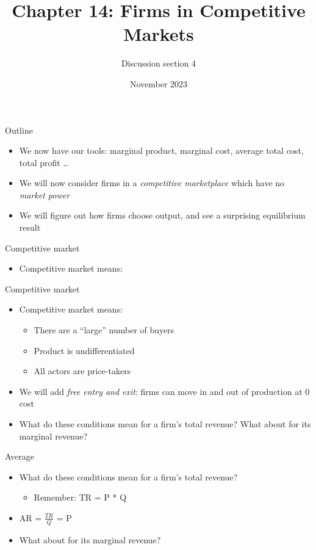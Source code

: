 \documentclass[aspectratio=169]{beamer}
\title{Chapter 14: Firms in Competitive Markets}
\author{Discussion section 4}
\date{November 2023}
\begin{document}
\begin{frame}
    \titlepage 
\end{frame}

\begin{frame}{Outline}
    \begin{itemize}
        \item We now have our tools: marginal product, marginal cost, average total cost, total profit \dots
        \item We will now consider firms in a \textit{competitive marketplace} which have no \textit{market power}
        \item We will figure out how firms choose output, and see a surprising equilibrium result
    \end{itemize}
\end{frame}

\begin{frame}{Competitive market}
    \begin{itemize}
        \item Competitive market means:
    \end{itemize}
\end{frame}

\begin{frame}{Competitive market}
    \begin{itemize}
        \item Competitive market means:
            \begin{itemize}
                \item There are a ``large'' number of buyers
                \item Product is undifferentiated
                \item All actors are price-takers
            \end{itemize}
        \item We will add \textit{free entry and exit}: firms can move in and out of production at 0 cost
        \item What do these conditions mean for a firm's total revenue? What about for its marginal revenue?
    \end{itemize}
\end{frame}

\begin{frame}{Average}
    \begin{itemize}
        \item What do these conditions mean for a firm's total revenue? 
            \begin{itemize}
                \item Remember: TR = P * Q
            \end{itemize}
        \item AR = $\frac{TR}{Q}$ = P
        \item What about for its marginal revenue? 
    \end{itemize}
\end{frame}
\end{document}

